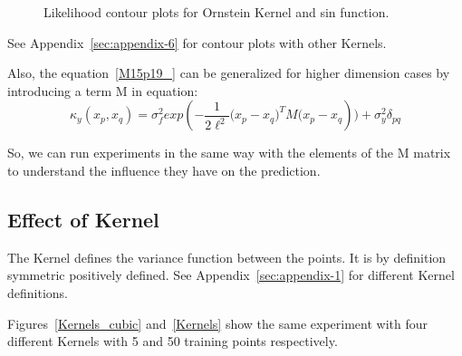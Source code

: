 \documentclass[]{IEEEtran}
\begin{document}
\begin{figure}[!htb]
  \centering
  \hspace{1mm}
  \hspace{1mm}
  \caption{Likelihood contour plots for Ornstein Kernel and sin function.}
  \label{contour_plots}
\end{figure}\par
See Appendix~\ref{sec:appendix-6} for contour plots with other Kernels.\par

Also, the equation~\ref{M15p19_} can be generalized for higher dimension cases by introducing a term M in equation:
\begin{equation}
{ \kappa  }_{ y }({ x }_{ p },{ x }_{ q })={ \sigma  }_{ f }^{ 2 }exp(-\frac { 1 }{ 2{ \ell  }^{ 2 } } { { ({ x }_{ p }-{ x }_{ q } }) }^{ T }M{ ({ x }_{ p }-{ x }_{ q } }))+{ \sigma  }_{ y }^{ 2 }{ \delta  }_{ pq }
\label{M15p19b}
\end{equation}\par
 So, we can run experiments in the same way  with the elements of the M matrix to understand the influence they have on the prediction. 
 
\subsection{Effect of Kernel}
The Kernel defines the variance function between the points. It is by definition symmetric positively defined. See Appendix~\ref{sec:appendix-1} for different Kernel definitions.\par
Figures~\ref{Kernels_cubic} and~\ref{Kernels} show the same experiment with four different Kernels with 5 and 50 training points respectively. 
\end{document}

